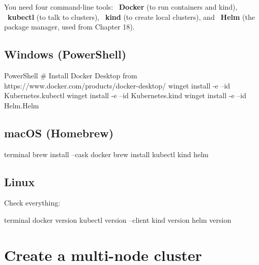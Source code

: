 You need four command-line tools:
~\textbf{Docker} (to run containers and kind),
~\textbf{kubectl} (to talk to clusters),
~\textbf{kind} (to create local clusters), and
~\textbf{Helm} (the package manager, used from Chapter 18).

\subsection{Windows (PowerShell)}

\begin{bashcode}{PowerShell}
# Install Docker Desktop from https://www.docker.com/products/docker-desktop/
winget install -e --id Kubernetes.kubectl
winget install -e --id Kubernetes.kind
winget install -e --id Helm.Helm
\end{bashcode}

\subsection{macOS (Homebrew)}

\begin{bashcode}{terminal}
brew install --cask docker
brew install kubectl kind helm
\end{bashcode}

\subsection{Linux}


Check everything:

\begin{bashcode}{terminal}
docker version
kubectl version --client
kind version
helm version
\end{bashcode}

\section{Create a multi-node cluster}

